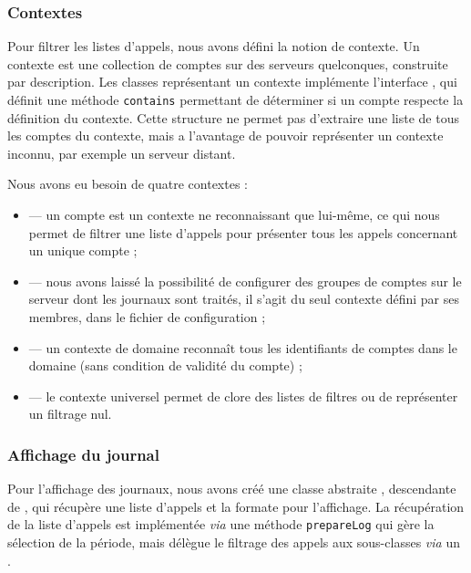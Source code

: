 \newpage

\subsubsection{Contextes}

Pour filtrer les listes d’appels, nous avons défini la notion de contexte. Un contexte est une collection de comptes sur des serveurs quelconques, construite par description. Les classes représentant un contexte implémente l’interface , qui définit une méthode \texttt{contains} permettant de déterminer si un compte respecte la définition du contexte. Cette structure ne permet pas d’extraire une liste de tous les comptes du contexte, mais a l’avantage de pouvoir représenter un contexte inconnu, par exemple un serveur distant.

Nous avons eu besoin de quatre contextes :
\begin{itemize}
	\item {} — un compte est un contexte ne reconnaissant que lui-même, ce qui nous permet de filtrer une liste d’appels pour présenter tous les appels concernant un unique compte ;
	\item {} — nous avons laissé la possibilité de configurer des groupes de comptes sur le serveur dont les journaux sont traités, il s’agit du seul contexte défini par ses membres, dans le fichier de configuration ;
	\item {} — un contexte de domaine reconnaît tous les identifiants de comptes dans le domaine (sans condition de validité du compte) ;
	\item {} — le contexte universel permet de clore des listes de filtres ou de représenter un filtrage nul.
\end{itemize}

\subsubsection{Affichage du journal}

Pour l’affichage des journaux, nous avons créé une classe abstraite , descendante de , qui récupère une liste d’appels  et la formate pour l’affichage. La récupération de la liste d’appels est implémentée \textit{via} une méthode \texttt{prepareLog} qui gère la sélection de la période, mais délègue le filtrage des appels aux sous-classes \textit{via} un .

